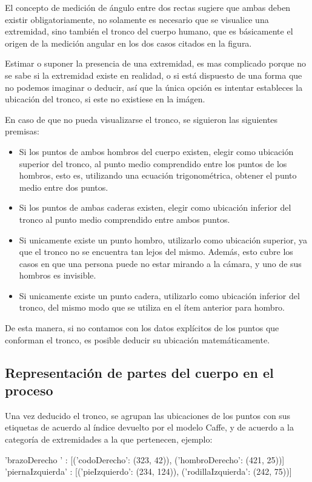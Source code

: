 \documentclass[a4paper,12pt,oneside,spanish]{book}
\begin{document}
El concepto de medición de ángulo entre dos rectas sugiere que ambas deben existir  obligatoriamente, no solamente es necesario que se visualice una extremidad, sino también el tronco del cuerpo humano, que es básicamente el origen de la medición angular en los dos casos citados en la figura. \par

Estimar o suponer la presencia de una extremidad, es mas complicado porque no se sabe si la extremidad existe en realidad, o si está dispuesto de una forma que no podemos imaginar o deducir, así que la única opción es intentar estableces la ubicación del tronco, si este no existiese en la imágen.\par

En caso de que no pueda visualizarse el tronco, se siguieron las siguientes premisas:
\begin{itemize}
	\item Si los puntos de ambos hombros del cuerpo existen, elegir como ubicación superior del tronco, al punto medio comprendido entre los puntos de los hombros, esto es, utilizando una ecuación trigonométrica, obtener el punto medio entre dos puntos.
	\item Si los puntos de ambas caderas existen, elegir como ubicación inferior del tronco al punto medio comprendido entre ambos puntos.
	\item Si unicamente existe un punto hombro, utilizarlo como ubicación superior, ya que el tronco no se encuentra tan lejos del mismo. Además, esto cubre los casos en que una persona puede no estar mirando a la cámara, y uno de sus hombros es invisible.
	\item Si unicamente existe un punto cadera, utilizarlo como ubicación inferior del tronco, del mismo modo que se utiliza en el ítem anterior para hombro. 
\end{itemize}
	
De esta manera, si no contamos con los datos explícitos de los puntos que conforman el tronco, es posible deducir su ubicación matemáticamente.\par

\subsection{Representación de partes del cuerpo en el proceso}
Una vez deducido el tronco, se agrupan las ubicaciones de los puntos con sus etiquetas de acuerdo al índice devuelto por el modelo Caffe, y de acuerdo a la categoría de extremidades a la que pertenecen, ejemplo:
\begin{center}
{\footnotesize 'brazoDerecho  ' : [('codoDerecho': (323, 42)),  ('hombroDerecho': (421, 25))]}  \\
{\footnotesize 'piernaIzquierda' : [('pieIzquierdo': (234, 124)), ('rodillaIzquierda': (242, 75))]}\\	
\end{center}
\end{document}
